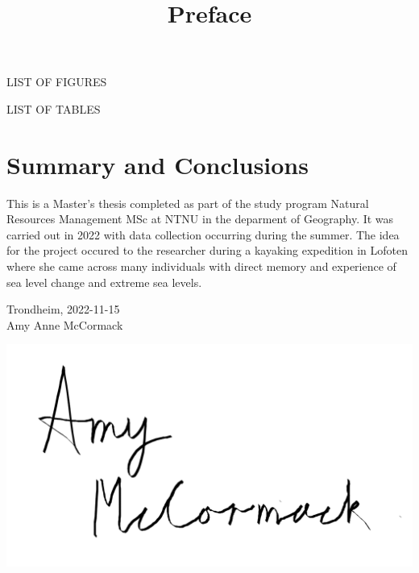 \documentclass{article}
\begin{document}
LIST OF FIGURES

LIST OF TABLES


\section*{Summary and Conclusions}

\title{Preface}
This is a Master's thesis completed as part of the study program Natural Resources Management MSc at NTNU in the deparment of Geography. It was carried out in 2022 with data collection occurring during the summer. The idea for the project occured to the researcher during a kayaking expedition in Lofoten where she came across many individuals with direct memory and experience of sea level change and extreme sea levels. \\[2cm]

\begin{center}
Trondheim, 2022-11-15\\[1pc]


Amy Anne McCormack 
\end{center}



\graphicspath{ {./images/} }
\includegraphics[scale=0.5]{fig/to use signature png}
\end{document}
